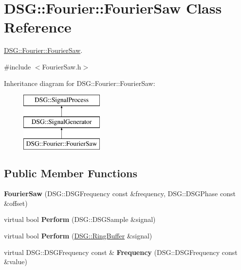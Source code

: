 \hypertarget{class_d_s_g_1_1_fourier_1_1_fourier_saw}{\section{D\+S\+G\+:\+:Fourier\+:\+:Fourier\+Saw Class Reference}
\label{class_d_s_g_1_1_fourier_1_1_fourier_saw}
}


\hyperlink{class_d_s_g_1_1_fourier_1_1_fourier_saw}{D\+S\+G\+::\+Fourier\+::\+Fourier\+Saw}.  




{\ttfamily \#include $<$Fourier\+Saw.\+h$>$}

Inheritance diagram for D\+S\+G\+:\+:Fourier\+:\+:Fourier\+Saw\+:\begin{figure}[H]
\begin{center}
\leavevmode
\includegraphics[height=3.000000cm]{class_d_s_g_1_1_fourier_1_1_fourier_saw}
\end{center}
\end{figure}
\subsection*{Public Member Functions}
\begin{DoxyCompactItemize}
\item 
\hypertarget{class_d_s_g_1_1_fourier_1_1_fourier_saw_a6062c388900f32e1cfd6df95b9760065}{{\bfseries Fourier\+Saw} (D\+S\+G\+::\+D\+S\+G\+Frequency const \&frequency, D\+S\+G\+::\+D\+S\+G\+Phase const \&offset)}\label{class_d_s_g_1_1_fourier_1_1_fourier_saw_a6062c388900f32e1cfd6df95b9760065}

\item 
\hypertarget{class_d_s_g_1_1_fourier_1_1_fourier_saw_a33061612ff24180f12e9a2c29dfaa116}{virtual bool {\bfseries Perform} (D\+S\+G\+::\+D\+S\+G\+Sample \&signal)}\label{class_d_s_g_1_1_fourier_1_1_fourier_saw_a33061612ff24180f12e9a2c29dfaa116}

\item 
\hypertarget{class_d_s_g_1_1_fourier_1_1_fourier_saw_ac890d9f0af523b63b96b07e6696a32b7}{virtual bool {\bfseries Perform} (\hyperlink{class_d_s_g_1_1_ring_buffer}{D\+S\+G\+::\+Ring\+Buffer} \&signal)}\label{class_d_s_g_1_1_fourier_1_1_fourier_saw_ac890d9f0af523b63b96b07e6696a32b7}

\item 
\hypertarget{class_d_s_g_1_1_fourier_1_1_fourier_saw_afa3d86f404be3665f10c74fe9286ef10}{virtual D\+S\+G\+::\+D\+S\+G\+Frequency const \& {\bfseries Frequency} (D\+S\+G\+::\+D\+S\+G\+Frequency const \&value)}\label{class_d_s_g_1_1_fourier_1_1_fourier_saw_afa3d86f404be3665f10c74fe9286ef10}

\end{DoxyCompactItemize}
